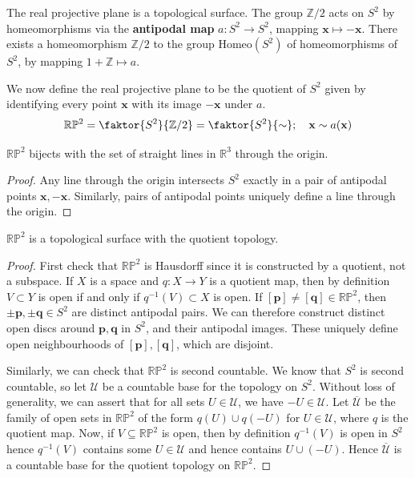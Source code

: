 \documentclass[a4paper]{article}
\begin{document}
\begin{example}
	The real projective plane is a topological surface.
	The group \( \mathbb Z / 2 \) acts on \( S^2 \) by homeomorphisms via the \textbf{antipodal map} \( a \colon S^2 \to S^2 \), mapping \( \mathbf{x} \mapsto -\mathbf x \).
	There exists a homeomorphism \( \mathbb Z / 2 \) to the group \( \mathrm{Homeo}(S^2) \) of homeomorphisms of \( S^2 \), by mapping \( 1 + \mathbb Z \mapsto a \).

	We now define the real projective plane to be the quotient of \( S^2 \) given by identifying every point \( \mathbf x \) with its image \( -\mathbf x \) under \( a \).
	\[
		\mathbb R \mathbb P^2 = \faktor{S^2}{\mathbb Z/2} = \faktor{S^2}{\sim};\quad \mathbf{x} \sim a(\mathbf{x})
	\]
	\begin{lemma}
		\( \mathbb R \mathbb P^2 \) bijects with the set of straight lines in \( \mathbb R^3 \) through the origin.
	\end{lemma}
	\begin{proof}
		Any line through the origin intersects \( S^2 \) exactly in a pair of antipodal points \( \mathbf{x}, -\mathbf{x} \).
		Similarly, pairs of antipodal points uniquely define a line through the origin.
	\end{proof}
	\begin{lemma}
		\( \mathbb R \mathbb P^2 \) is a topological surface with the quotient topology.
	\end{lemma}
	\begin{proof}
		First check that \( \mathbb R \mathbb P^2 \) is Hausdorff since it is constructed by a quotient, not a subspace.
		If \( X \) is a space and \( q \colon X \to Y \) is a quotient map, then by definition \( V \subset Y \) is open if and only if \( q^{-1}(V) \subset X \) is open.
		If \( [\mathbf p] \neq [\mathbf q] \in \mathbb R \mathbb P^2 \), then \( \pm \mathbf p, \pm \mathbf q \in S^2 \) are distinct antipodal pairs.
		We can therefore construct distinct open discs around \( \mathbf p, \mathbf q \) in \( S^2 \), and their antipodal images.
		These uniquely define open neighbourhoods of \( [\mathbf p], [\mathbf q] \), which are disjoint.

		Similarly, we can check that \( \mathbb R \mathbb P^2 \) is second countable.
		We know that \( S^2 \) is second countable, so let \( \mathcal U \) be a countable base for the topology on \( S^2 \).
		Without loss of generality, we can assert that for all sets \( U \in \mathcal U \), we have \( -U \in \mathcal U \).
		Let \( \overline{\mathcal U} \) be the family of open sets in \( \mathbb R \mathbb P^2 \) of the form \( q(U) \cup q(-U) \) for \( U \in \mathcal U \), where \( q \) is the quotient map.
		Now, if \( V \subseteq \mathbb R \mathbb P^2 \) is open, then by definition \( q^{-1}(V) \) is open in \( S^2 \) hence \( q^{-1}(V) \) contains some \( U \in \mathcal U \) and hence contains \( U \cup (-U) \).
		Hence \( \overline{\mathcal U} \) is a countable base for the quotient topology on \( \mathbb R \mathbb P^2 \).


\end{proof}
\end{example}
\end{document}
